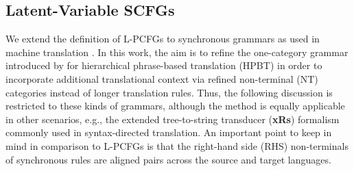\documentclass[11pt]{article}
\begin{document}
\subsection{Latent-Variable SCFGs}
\label{sec:formalism}
We extend the definition of L-PCFGs \cite{Matsuzaki2005,Petrov2006} to synchronous grammars as used in machine translation \cite{Galley2004,Chiang2005}. 
In this work, the aim is to refine the one-category grammar introduced by  for hierarchical phrase-based translation (HPBT) in order to incorporate additional translational context via refined non-terminal (NT) categories instead of longer translation rules.  
Thus, the following discussion is restricted to these kinds of grammars, although the method is equally applicable in other scenarios, e.g., the extended tree-to-string transducer ({\bf xRs}) formalism \cite{Huang2006,Graehl2008} commonly used in syntax-directed translation.  
An important point to keep in mind in comparison to L-PCFGs is that the right-hand side (RHS) non-terminals of synchronous rules are aligned pairs across the source and target languages.  
\end{document}
